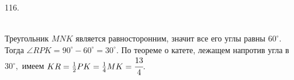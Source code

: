 116. \begin{figure}[ht!]
\end{figure}\\
Треугольник $MNK$ является равносторонним, значит все его углы равны $60^\circ.$ Тогда $\angle RPK=90^\circ-60^\circ=30^\circ.$ По теореме о катете, лежащем напротив угла в $30^\circ,$ имеем $KR=\frac{1}{2}PK=\frac{1}{4}MK=\cfrac{13}{4}.$\\
